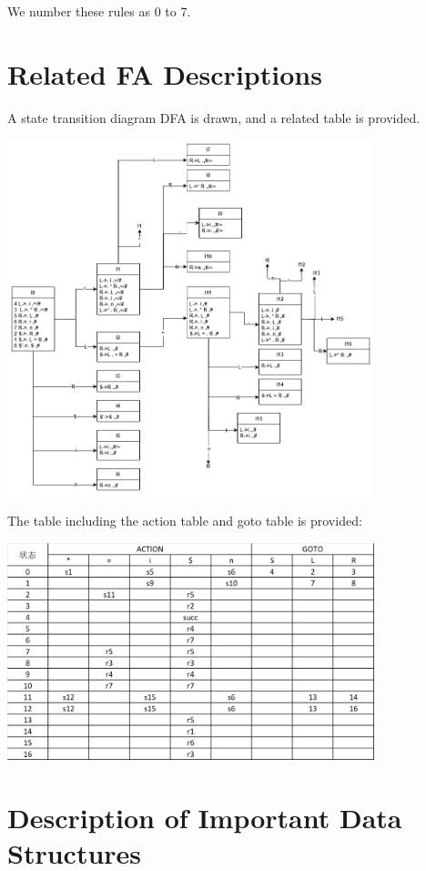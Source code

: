 \documentclass[a4paper,12pt]{article}
\begin{document}
We number these rules as 0 to 7.

\section{Related FA Descriptions}
A state transition diagram DFA is drawn, and a related table is provided. 

\vspace{10pt}
\centerline{\includegraphics[width=0.8\textwidth]{photo/1.png}}
\vspace{10pt}

The table including the action table and goto table is provided:

\vspace{10pt}
\centerline{\includegraphics[width=0.8\textwidth]{photo/4.png}}
\vspace{10pt}

\section{Description of Important Data Structures}
\end{document}
